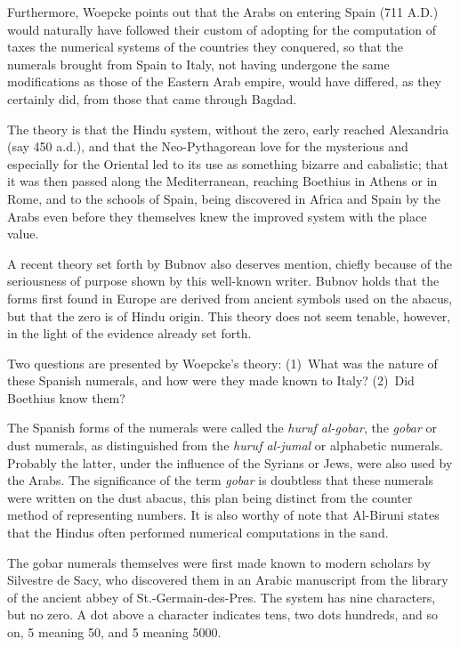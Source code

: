 \documentclass[11pt,a4paper]{article}
\begin{document}
Furthermore, Woepcke points out that the Arabs on entering Spain (711 A.D.) would naturally have followed their custom of adopting for the computation of taxes the numerical systems of the countries they conquered, so that the numerals brought from Spain to Italy, not having undergone the same modifications as those of the Eastern Arab empire, would have differed, as they certainly did, from those that came through Bagdad.

The theory is that the Hindu system, without the zero, early reached Alexandria (say 450 a.d.), and that the Neo-Pythagorean love for the mysterious and especially for the Oriental led to its use as something bizarre and cabalistic; that it was then passed along the Mediterranean, reaching Boethius in Athens or in Rome, and to the schools of Spain, being discovered in Africa and Spain by the Arabs even before they themselves knew the improved system with the place value.

A recent theory set forth by Bubnov also deserves mention, chiefly because of the seriousness of purpose shown by this well-known writer. Bubnov holds that the forms first found in Europe are derived from ancient symbols used on the abacus, but that the zero is of Hindu origin. This theory does not seem tenable, however, in the light of the evidence already set forth.

Two questions are presented by Woepcke's theory: (1)~What was the nature of these Spanish numerals, and how were they made known to Italy? (2)~Did Boethius know them?

The Spanish forms of the numerals were called the \textit{huruf al-gobar}, the \textit{gobar} or dust numerals, as distinguished from the \textit{huruf al-jumal} or alphabetic numerals. Probably the latter, under the influence of the Syrians or Jews, were also used by the Arabs. The significance of the term \textit{gobar} is doubtless that these numerals were written on the dust abacus, this plan being distinct from the counter method of representing numbers. It is also worthy of note that Al-Biruni states that the Hindus often performed numerical computations in the sand.

The gobar numerals themselves were first made known to modern scholars by Silvestre de Sacy, who discovered them in an Arabic manuscript from the library of the ancient abbey of St.-Germain-des-Pres. The system has nine characters, but no zero. A dot above a character indicates tens, two dots hundreds, and so on, 5 meaning 50, and 5 meaning 5000.
\end{document}
